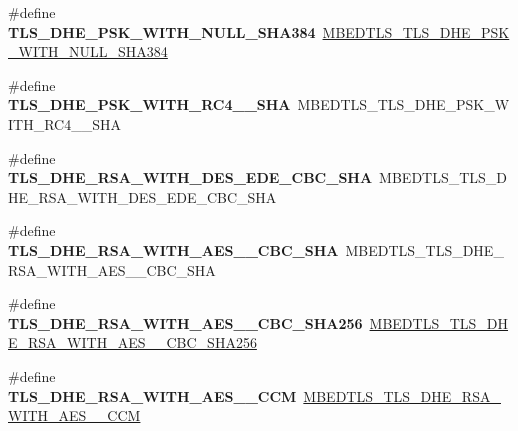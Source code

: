 \begin{DoxyCompactItemize}
\#define {\bfseries T\+L\+S\+\_\+\+D\+H\+E\+\_\+\+P\+S\+K\+\_\+\+W\+I\+T\+H\+\_\+\+N\+U\+L\+L\+\_\+\+S\+H\+A384}~\mbox{\hyperlink{ssl__ciphersuites_8h_a994c1e5eeb9faf326e80180a4e501c7a}{M\+B\+E\+D\+T\+L\+S\+\_\+\+T\+L\+S\+\_\+\+D\+H\+E\+\_\+\+P\+S\+K\+\_\+\+W\+I\+T\+H\+\_\+\+N\+U\+L\+L\+\_\+\+S\+H\+A384}}
\item 
\mbox{\label{compat-1_83_8h_a54b5b4dd81ed99205bccb629048e74e4}} 
\#define {\bfseries T\+L\+S\+\_\+\+D\+H\+E\+\_\+\+P\+S\+K\+\_\+\+W\+I\+T\+H\+\_\+\+R\+C4\+\_\+\_\+\+S\+HA}~M\+B\+E\+D\+T\+L\+S\+\_\+\+T\+L\+S\+\_\+\+D\+H\+E\+\_\+\+P\+S\+K\+\_\+\+W\+I\+T\+H\+\_\+\+R\+C4\+\_\+\_\+\+S\+HA
\item 
\mbox{\label{compat-1_83_8h_a067a9a52266f1e6505ec90a36f0c4fd6}} 
\#define {\bfseries T\+L\+S\+\_\+\+D\+H\+E\+\_\+\+R\+S\+A\+\_\+\+W\+I\+T\+H\+\_\+D\+E\+S\+\_\+\+E\+D\+E\+\_\+\+C\+B\+C\+\_\+\+S\+HA}~M\+B\+E\+D\+T\+L\+S\+\_\+\+T\+L\+S\+\_\+\+D\+H\+E\+\_\+\+R\+S\+A\+\_\+\+W\+I\+T\+H\+\_\+D\+E\+S\+\_\+\+E\+D\+E\+\_\+\+C\+B\+C\+\_\+\+S\+HA
\item 
\mbox{\label{compat-1_83_8h_aab1a72487e5a66ec94a42eb8e88a09f7}} 
\#define {\bfseries T\+L\+S\+\_\+\+D\+H\+E\+\_\+\+R\+S\+A\+\_\+\+W\+I\+T\+H\+\_\+\+A\+E\+S\+\_\+\_\+\+C\+B\+C\+\_\+\+S\+HA}~M\+B\+E\+D\+T\+L\+S\+\_\+\+T\+L\+S\+\_\+\+D\+H\+E\+\_\+\+R\+S\+A\+\_\+\+W\+I\+T\+H\+\_\+\+A\+E\+S\+\_\+\_\+\+C\+B\+C\+\_\+\+S\+HA
\item 
\mbox{\label{compat-1_83_8h_a7a57810f4fe1339ae63ca4771661ad04}} 
\#define {\bfseries T\+L\+S\+\_\+\+D\+H\+E\+\_\+\+R\+S\+A\+\_\+\+W\+I\+T\+H\+\_\+\+A\+E\+S\+\_\+\_\+\+C\+B\+C\+\_\+\+S\+H\+A256}~\mbox{\hyperlink{ssl__ciphersuites_8h_af907f21f9472157e01484c8d1035d675}{M\+B\+E\+D\+T\+L\+S\+\_\+\+T\+L\+S\+\_\+\+D\+H\+E\+\_\+\+R\+S\+A\+\_\+\+W\+I\+T\+H\+\_\+\+A\+E\+S\+\_\+\_\+\+C\+B\+C\+\_\+\+S\+H\+A256}}
\item 
\mbox{\label{compat-1_83_8h_a6c93ed48205031a19333788624a47b01}} 
\#define {\bfseries T\+L\+S\+\_\+\+D\+H\+E\+\_\+\+R\+S\+A\+\_\+\+W\+I\+T\+H\+\_\+\+A\+E\+S\+\_\+\_\+\+C\+CM}~\mbox{\hyperlink{ssl__ciphersuites_8h_a822d364e10b957f50417ba405cfa287c}{M\+B\+E\+D\+T\+L\+S\+\_\+\+T\+L\+S\+\_\+\+D\+H\+E\+\_\+\+R\+S\+A\+\_\+\+W\+I\+T\+H\+\_\+\+A\+E\+S\+\_\+\_\+\+C\+CM}}

\end{DoxyCompactItemize}
